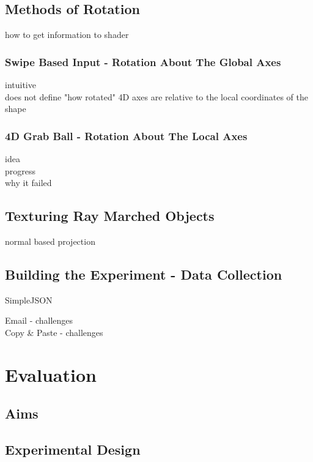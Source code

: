 \documentclass{l4proj}
\begin{document}
\section{Methods of Rotation}

how to get information to shader

\subsection{Swipe Based Input - Rotation About The Global Axes}

intuitive\\
does not define "how rotated" 4D axes are relative to the local coordinates of the shape

\subsection{4D Grab Ball - Rotation About The Local Axes}

idea\\
progress\\
why it failed

\section{Texturing Ray Marched Objects}

normal based projection

\citep{the_art_of_code_how_2020}

\section{Building the Experiment - Data Collection}

SimpleJSON \citep{bunny83_simplejson_nodate}

Email - challenges\\
Copy \& Paste - challenges

\chapter{Evaluation} 

\section{Aims} 

\section{Experimental Design}
\end{document}
